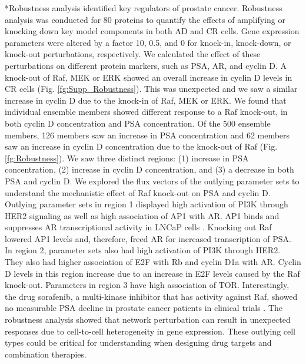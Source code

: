 \documentclass[12pt]{article}
\makeatletter
\renewcommand\subsection{\@startsection
	{subsection}{2}{0mm}
	{-0.05in}
	{-0.5\baselineskip}
	{\normalfont\normalsize\bfseries}}
\makeatother
\begin{document}
  
\subsection*{Robustness analysis identified key regulators of prostate cancer.} 
Robustness analysis was conducted for 80 proteins to quantify the effects of amplifying or knocking down key model components in both AD and CR cells. 
Gene expression parameters were altered by a factor 10, 0.5, and 0 for knock-in, knock-down, or knock-out perturbations, respectively.
We calculated the effect of these perturbations on different protein markers, such as PSA, AR, and cyclin D. 
A knock-out of Raf, MEK or ERK showed an overall increase in cyclin D levels in CR cells (Fig. \ref{fg:Supp_Robustness}). 
This was unexpected and we saw a similar increase in cyclin D due to the knock-in of Raf, MEK or ERK. 
We found that individual ensemble members showed different response to a Raf knock-out, in both cyclin D concentration and PSA concentration. 
Of the 500 ensemble members, 126 members saw an increase in PSA concentration and 62 members saw an increase in cyclin D concentration due to the knock-out of Raf (Fig. \ref{fg:Robustness}). 
We saw three distinct regions: (1) increase in PSA concentration, (2) increase in cyclin D concentration, and (3) a decrease in both PSA and cyclin D. 
We explored the flux vectors of the outlying parameter sets to understand the mechanistic effect of Raf knock-out on PSA and cyclin D. 
Outlying parameter sets in region 1 displayed high activation of PI3K through HER2 signaling as well as high association of AP1 with AR. 
AP1 binds and suppresses AR transcriptional activity in LNCaP cells \cite{Sato1997}. 
Knocking out Raf lowered AP1 levels and, therefore, freed AR for increased transcription of PSA.
In region 2, parameter sets also had high activation of PI3K through HER2. 
They also had higher association of E2F with Rb and cyclin D1a with AR. 
Cyclin D levels in this region increase due to an increase in E2F levels caused by the Raf knock-out. 
Parameters in region 3 have high association of TOR. 
Interestingly, the drug sorafenib, a multi-kinase inhibitor that has activity against Raf, showed no measurable PSA decline in prostate cancer patients in clinical trials \cite{Dahut2008}. 
The robustness analysis showed that network perturbation can result in unexpected responses due to cell-to-cell heterogeneity in gene expression. 
These outlying cell types could be critical for understanding when designing drug targets and combination therapies.
\end{document}
